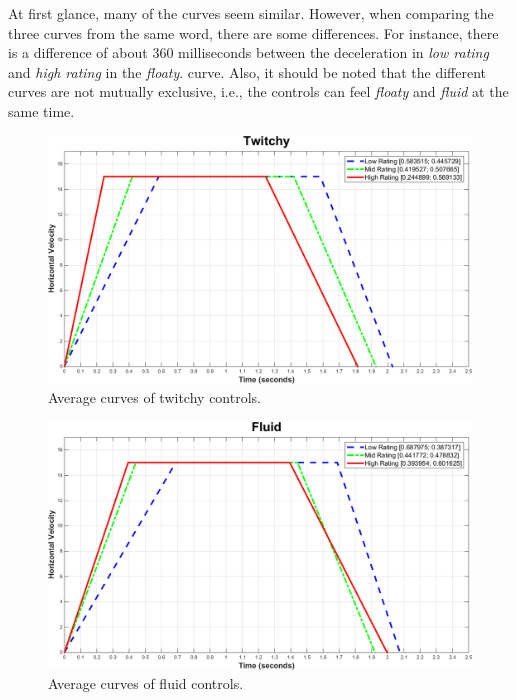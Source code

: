 At first glance, many of the curves seem similar. However, when comparing the three curves from the same word, there are some differences. For instance, there is a difference of about 360 milliseconds between the deceleration in \textit{low rating} and \textit{high rating} in the \textit{floaty}. curve. Also, it should be noted that the different curves are not mutually exclusive, i.e., the controls can feel \textit{floaty} and \textit{fluid} at the same time.

\begin{figure}[htbp]
\centering
\includegraphics[width=0.9\columnwidth]{Pics/Curves/Twitchy_curve}
\caption{Average curves of twitchy controls.}
\label{fig:curve_twitchy}
\end{figure}

\begin{figure}[htbp]
\centering
\includegraphics[width=0.9\columnwidth]{Pics/Curves/Fluid_curve}
\caption{Average curves of fluid controls.}
\label{fig:curve_fluid}
\end{figure}

